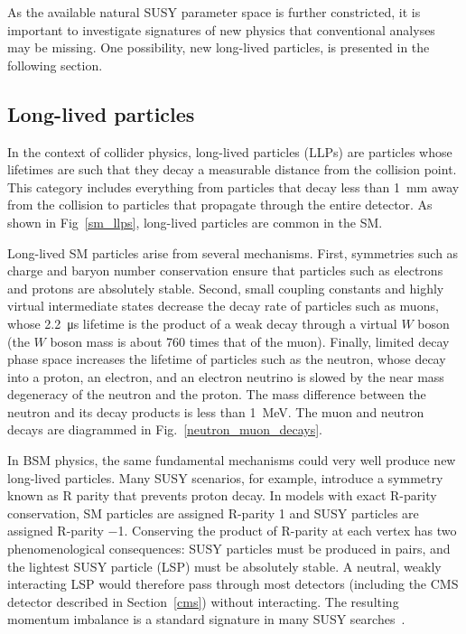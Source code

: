 

As the available natural SUSY parameter space is further constricted, it is important to investigate signatures of new physics that conventional analyses may be missing. One possibility, new long-lived particles, is presented in the following section.


\subsection{Long-lived particles}
\label{llps}
In the context of collider physics, long-lived particles (LLPs) are particles whose lifetimes are such that they decay a measurable distance from the collision point. This category includes everything from particles that decay less than \SI{1}{\mm} away from the collision to particles that propagate through the entire detector. As shown in Fig~\ref{sm_llps}, long-lived particles are common in the SM.



Long-lived SM particles arise from several mechanisms. First, symmetries such as charge and baryon number conservation ensure that particles such as electrons and protons are absolutely stable. Second, small coupling constants and highly virtual intermediate states decrease the decay rate of particles such as muons, whose \SI{2.2}{\us} lifetime is the product of a weak decay through a virtual $W$ boson (the $W$ boson mass is about \num{760} times that of the muon). Finally, limited decay phase space increases the lifetime of particles such as the neutron, whose decay into a proton, an electron, and an electron neutrino is slowed by the near mass degeneracy of the neutron and the proton. The mass difference between the neutron and its decay products is less than \SI{1}{\MeV}. The muon and neutron decays are diagrammed in Fig.~\ref{neutron_muon_decays}.



In BSM physics, the same fundamental mechanisms could very well produce new long-lived particles. Many SUSY scenarios, for example, introduce a symmetry known as R parity that prevents proton decay. In models with exact R-parity conservation, SM particles are assigned R-parity \num{+1} and SUSY particles are assigned R-parity \num{-1}. Conserving the product of R-parity at each vertex has two phenomenological consequences: SUSY particles must be produced in pairs, and the lightest SUSY particle (LSP) must be absolutely stable. A neutral, weakly interacting LSP would therefore pass through most detectors (including the CMS detector described in Section~\ref{cms}) without interacting. The resulting momentum imbalance is a standard signature in many SUSY searches~\cite{pdg_2020}.

